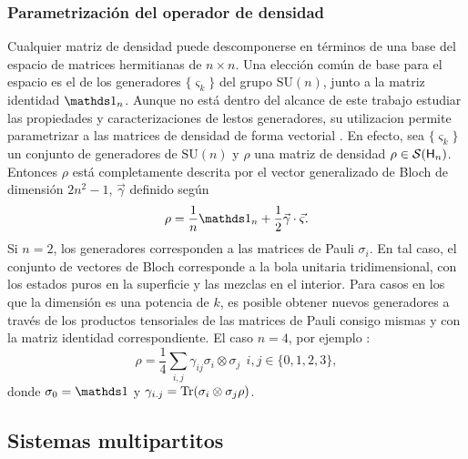 \subsubsection{Parametrización del operador de densidad}
Cualquier matriz de densidad puede descomponerse en términos de una base del espacio de matrices hermitianas de $n\times n$. Una elección común de base para el espacio es el de los generadores $\{\varsigma_{k}\}$ del grupo $\text{SU}(n)$, junto a la matriz identidad $\Id_{n}$. Aunque no está dentro del alcance de este trabajo estudiar las propiedades y caracterizaciones de lestos generadores, su utilizacion permite parametrizar a las matrices de densidad de forma vectorial \cite{Bruning}. En efecto, sea $\{\varsigma_{k}\}$ un conjunto de generadores de $\text{SU}(n)$ y $\rho$ una matriz de densidad $\rho\in\mathcal{S}({\sf H}_{n})$. Entonces $\rho$ está completamente descrita por el vector generalizado de Bloch de dimensión $2n^{2}-1$, $\vec{\gamma}$ definido según
\begin{equation}
    \rho=\frac{1}{n}\Id_{n}+\frac{1}{2}\vec{\gamma}\cdot\vec{\varsigma}.
\end{equation}
Si $n=2$, los generadores corresponden a las matrices de Pauli $\sigma_{i}$. En tal caso, el conjunto de vectores de Bloch corresponde a la bola unitaria tridimensional, con los estados puros en la superficie y las mezclas en el interior. Para casos en los que la dimensión es una potencia de $k$, es posible obtener nuevos generadores a través de los productos tensoriales de las matrices de Pauli consigo mismas y con la matriz identidad correspondiente. El caso $n=4$, por ejemplo \cite{Chuang}:
\begin{equation}\label{eq::BlochParametrization4}
    \rho=\frac{1}{4}\sum_{i,j}\gamma_{ij}\sigma_{i}\otimes \sigma_{j} \ \ i,j\in\{0,1,2,3\},
\end{equation}
donde $\sigma_{0}=\Id$ y $\gamma_{i.j}=\Tr(\sigma_{i}\otimes \sigma_{j}\rho)$.



\subsection{Sistemas multipartitos}\label{sec:Ch1PartialTrace}

